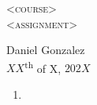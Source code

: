\documentclass[12pt, a4paper]{article}
\begin{document}
\begin{center}
    \textsc{\huge <course>}\\
    \textsc{\large <assignment>}\\
\end{center}
\begin{flushright}
    Daniel Gonzalez\\
    $XX$\textsuperscript{th} of X, $202X$
\end{flushright}

\begin{enumerate}
    \item
\end{enumerate}
\end{document}
